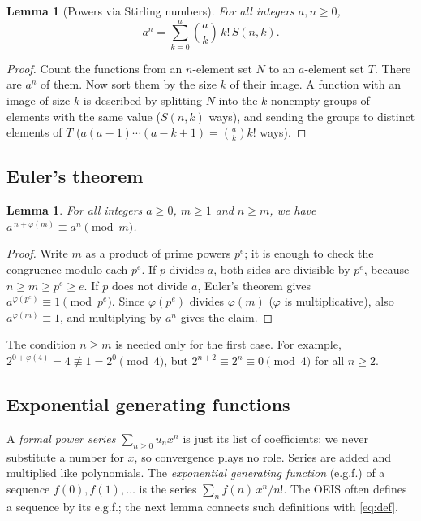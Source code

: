 \documentclass[11pt,a4paper]{article}
\newtheorem{lemma}[theorem]{Lemma}
\theoremstyle{definition}
\theoremstyle{remark}
\begin{document}
\begin{lemma}[Powers via Stirling numbers]\label{lem:power}
For all integers $a,n\ge0$,
\[
a^n=\sum_{k=0}^{a}\binom{a}{k}\,k!\,S(n,k).
\]
\end{lemma}

\begin{proof}
Count the functions from an $n$-element set $N$ to an $a$-element set $T$. There are $a^n$ of them. Now sort them by the
size $k$ of their image. A function with an image of size $k$ is described by splitting $N$ into the $k$ nonempty groups
of elements with the same value ($S(n,k)$ ways), and sending the groups to distinct elements of $T$
($a(a-1)\cdots(a-k+1)=\binom ak k!$ ways).
\end{proof}

\subsection{Euler's theorem}
\begin{lemma}\label{lem:euler}
For all integers $a\ge0$, $m\ge1$ and $n\ge m$, we have $a^{\,n+\varphi(m)}\equiv a^n\pmod m$.
\end{lemma}

\begin{proof}
Write $m$ as a product of prime powers $p^e$; it is enough to check the congruence modulo each $p^e$. If $p$ divides
$a$, both sides are divisible by $p^e$, because $n\ge m\ge p^e\ge e$. If $p$ does not divide $a$, Euler's theorem gives
$a^{\varphi(p^e)}\equiv1\pmod{p^e}$. Since $\varphi(p^e)$ divides $\varphi(m)$ ($\varphi$ is multiplicative), also
$a^{\varphi(m)}\equiv1$, and multiplying by $a^n$ gives the claim.
\end{proof}

The condition $n\ge m$ is needed only for the first case. For example, $2^{0+\varphi(4)}=4\not\equiv1=2^0\pmod 4$, but
$2^{n+2}\equiv2^n\equiv0\pmod4$ for all $n\ge2$.

\subsection{Exponential generating functions}
A \emph{formal power series} $\sum_{n\ge0}u_nx^n$ is just its list of coefficients; we never substitute a number for $x$,
so convergence plays no role. Series are added and multiplied like polynomials. The \emph{exponential generating
function} (e.g.f.) of a sequence $f(0),f(1),\dots$ is the series $\sum_nf(n)\,x^n/n!$. The OEIS often defines a sequence by
its e.g.f.; the next lemma connects such definitions with \eqref{eq:def}.
\end{document}
